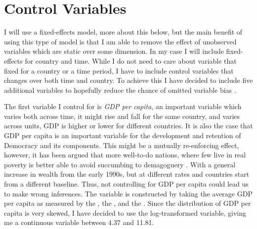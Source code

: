 \section{Control Variables} \label{control}
I will use a fixed-effects model, more about this below, but the main benefit of using this type of model is that I am able to remove the effect of unobserved variables which are static over some dimension. In my case I will include fixed-effects for country and time. While I do not need to care about variable that fixed for a country or a time period,  I have to include control variables that changes over both time and country. To achieve this I have decided to include five additional variables to hopefully reduce the chance of omitted variable bias \citep[pp. 81-85]{wooldridge_econometric_2010}.

The first variable I control for is \textit{GDP per capita}, an important variable which varies both across time, it might rise and fall for the same country, and varies across units, GDP is higher or lower for different countries. It is also the case that GDP per capita is an important variable for the development and retention of Democracy and its components. This might be a mutually re-enforcing effect, however, it has been argued that more well-to-do nations, where few live in real poverty is better able to avoid succumbing to demagoguery \citep[p. 75]{lipset_social_1959}. With a general increase in wealth from the early 1990s, but at different rates and countries start from a different baseline. Thus, not controlling for GDP per capita could lead us to make wrong inferences. The variable is constructed by taking the average GDP per capita as measured by the \citet{world_bank_world_2025}, the \citet{imf_world_2025}, and the \citet{united_nations_statistics_division_national_2025}. Since the distribution of GDP per capita is very skewed, I have decided to use the log-transformed variable, giving me a continuous variable between 4.37 and 11.81. 

